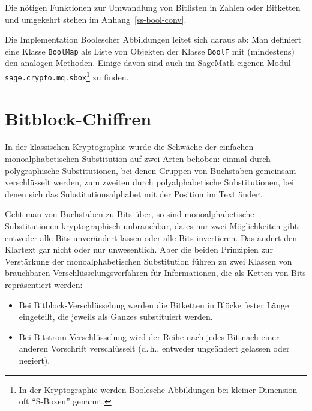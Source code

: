 \begin{refsegment}
Die nötigen Funktionen zur Umwandlung von Bitlisten in Zahlen oder Bitketten
und umgekehrt stehen im Anhang~\ref{ss-bool-conv}.

Die Implementation Boolescher
Abbildungen leitet
sich daraus ab: Man definiert
eine Klasse {\tt BoolMap} als Liste von Objekten der Klasse {\tt BoolF} mit
(mindestens) den analogen Methoden. Einige davon sind auch im SageMath-eigenen Modul
{\tt sage.crypto.mq.sbox}\footnote{%
  In der Kryptographie werden Boolesche Abbildungen bei kleiner Dimension
  oft "`S-Boxen"' genannt.
} zu finden.


\section{Bitblock-Chiffren}\label{s-bool-bitbl}

In der klassischen Kryptographie wurde die Schwäche der einfachen
monoalphabetischen Substitution auf zwei Arten behoben: einmal durch
polygraphische
Substitutionen,
bei denen Gruppen von Buchstaben
gemeinsam verschlüsselt werden, zum zweiten durch polyalphabetische
Substitutionen,
bei denen sich das Substitutionsalphabet mit der Position im Text ändert.

Geht man von Buchstaben zu Bits über, so sind monoalphabetische
Substitutionen kryptographisch unbrauchbar, da es nur zwei
Möglichkeiten gibt: entweder alle Bits unverändert lassen oder alle
Bits invertieren. Das ändert den Klartext gar nicht oder nur
unwesentlich. Aber die beiden Prinzipien zur Verstärkung der
monoalphabetischen Substitution führen zu zwei Klassen von brauchbaren
Verschlüsselungsverfahren für Informationen, die als Ketten von Bits
repräsentiert werden:
\begin{itemize}
   \item Bei Bitblock-Verschlüsselung
      werden die Bitketten in Blöcke
      fester Länge eingeteilt, die jeweils als Ganzes substituiert
      werden.
   \item Bei Bitstrom-Verschlüsselung
      wird der Reihe nach jedes Bit
      nach einer anderen Vorschrift verschlüsselt (d.\,h., entweder
      ungeändert gelassen oder negiert).
\end{itemize}


\end{refsegment}
